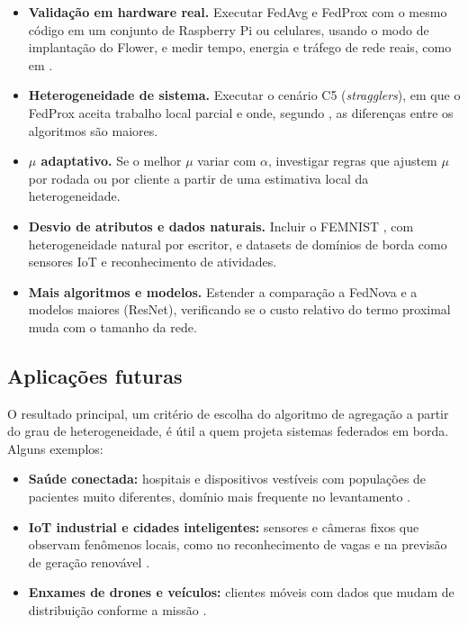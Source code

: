 \begin{itemize}[leftmargin=*, itemsep=2pt]
    \item \textbf{Validação em hardware real.} Executar FedAvg e FedProx com o mesmo código em um conjunto de Raspberry Pi ou celulares, usando o modo de implantação do Flower, e medir tempo, energia e tráfego de rede reais, como em \citet{carranco2025adhoc}.
    \item \textbf{Heterogeneidade de sistema.} Executar o cenário C5 (\textit{stragglers}), em que o FedProx aceita trabalho local parcial e onde, segundo \citet{cheng2026stragglers}, as diferenças entre os algoritmos são maiores.
    \item \textbf{$\mu$ adaptativo.} Se o melhor $\mu$ variar com $\alpha$, investigar regras que ajustem $\mu$ por rodada ou por cliente a partir de uma estimativa local da heterogeneidade.
    \item \textbf{Desvio de atributos e dados naturais.} Incluir o FEMNIST \citep{caldas2018leaf}, com heterogeneidade natural por escritor, e datasets de domínios de borda como sensores IoT e reconhecimento de atividades.
    \item \textbf{Mais algoritmos e modelos.} Estender a comparação a FedNova \citep{wang2020fednova} e a modelos maiores (ResNet), verificando se o custo relativo do termo proximal muda com o tamanho da rede.
\end{itemize}

\subsection{Aplicações futuras}

O resultado principal, um critério de escolha do algoritmo de agregação a partir do grau de heterogeneidade, é útil a quem projeta sistemas federados em borda. Alguns exemplos:

\begin{itemize}[leftmargin=*, itemsep=2pt]
    \item \textbf{Saúde conectada:} hospitais e dispositivos vestíveis com populações de pacientes muito diferentes, domínio mais frequente no levantamento \citep{mahmood2025alzheimer, mim2025healthcare}.
    \item \textbf{IoT industrial e cidades inteligentes:} sensores e câmeras fixos que observam fenômenos locais, como no reconhecimento de vagas \citep{bakr2026parkfl} e na previsão de geração renovável \citep{ghosh2026renewable}.
    \item \textbf{Enxames de drones e veículos:} clientes móveis com dados que mudam de distribuição conforme a missão \citep{hu2025uav}.
\end{itemize}

